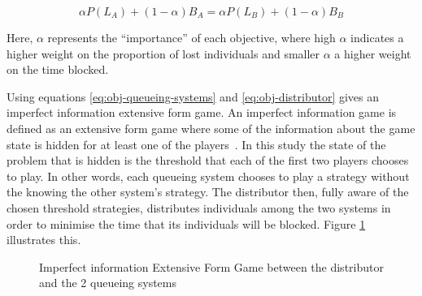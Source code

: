 \begin{equation}\label{eq:obj-distributor}
    \alpha P(L_A) + (1 - \alpha) B_A = 
    \alpha P(L_B) + (1 - \alpha) B_B
\end{equation}

Here, \(\alpha\) represents the ``importance'' of each objective,
where high \(\alpha\) indicates a higher weight on the proportion of lost 
individuals and smaller \(\alpha\) a higher weight on the time blocked. 


Using equations \ref{eq:obj-queueing-systems} and \ref{eq:obj-distributor} gives
an imperfect information extensive form game. 
An imperfect information game is defined as an extensive form game where some 
of the information about the game state is hidden for at least one of the 
players~\cite{Berwanger2008}. In this study the state of the problem that is
hidden is the threshold that each of the first two players chooses to play.
In other words, each queueing system chooses to play a strategy without the 
knowing the other system's strategy.
The distributor then, fully aware of the chosen threshold strategies, distributes 
individuals among the two systems in order to minimise the time that its 
individuals will be blocked. Figure \ref{fig:imperfect-info-game} illustrates this. 

\begin{figure}[ht]
    \centering
    \caption{Imperfect information Extensive Form Game between the distributor 
    and the 2 queueing systems}
    \label{fig:imperfect-info-game}
\end{figure}

